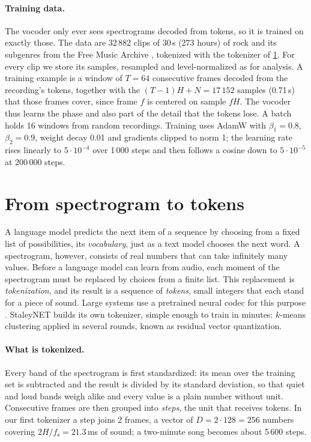 \paragraph{Training data.} The vocoder only ever sees spectrograms decoded
from tokens, so it is trained on exactly those. The data are 32\,882 clips of
30\,s (273 hours) of rock and its subgenres from the Free Music Archive
\cite{defferrard2017fma}, tokenized with the tokenizer of
\cref{sec:tokenizer}. For every clip we store its samples, resampled and
level-normalized as for analysis. A training example is a window of $T = 64$
consecutive frames decoded from the recording's tokens, together with the
$(T - 1)H + N = 17\,152$ samples (0.71\,s) that those frames cover, since frame
$f$ is centered on sample $fH$. The vocoder thus learns the phase and also part
of the detail that the tokens lose. A batch holds 16 windows from random
recordings. Training uses AdamW \cite{loshchilov2019adamw} with $\beta_1 =
0.8$, $\beta_2 = 0.9$, weight decay 0.01 and gradients clipped to norm 1;
the learning rate rises linearly to $5 \cdot 10^{-4}$ over 1\,000 steps and
then follows a cosine down to $5 \cdot 10^{-5}$ at 200\,000 steps.

\section{From spectrogram to tokens}
\label{sec:tokenizer}

A language model predicts the next item of a sequence by choosing from a
fixed list of possibilities, its \emph{vocabulary}, just as a text model
chooses the next word. A spectrogram, however, consists of real numbers that
can take infinitely many values. Before a language model can learn from audio,
each moment of the spectrogram must be replaced by choices from a finite list.
This replacement is \emph{tokenization}, and its result is a sequence of
\emph{tokens}, small integers that each stand for a piece of sound. Large
systems use a pretrained neural codec for this purpose
\cite{zeghidour2021soundstream,defossez2023encodec,kumar2023dac}. StaleyNET
builds its own tokenizer, simple enough to train in minutes: $k$-means
clustering applied in several rounds, known as residual vector quantization.

\paragraph{What is tokenized.} Every band of the spectrogram is first
standardized: its mean over the training set is subtracted and the result is
divided by its standard deviation, so that quiet and loud bands weigh alike
and every value is a plain number without unit. Consecutive frames are then
grouped into \emph{steps}, the unit that receives tokens. In our first
tokenizer a step joins 2 frames, a vector of $D = 2 \cdot 128 = 256$ numbers
covering $2H/f_\text{s} = 21.3$\,ms of sound; a two-minute song becomes about
5\,600 steps.

